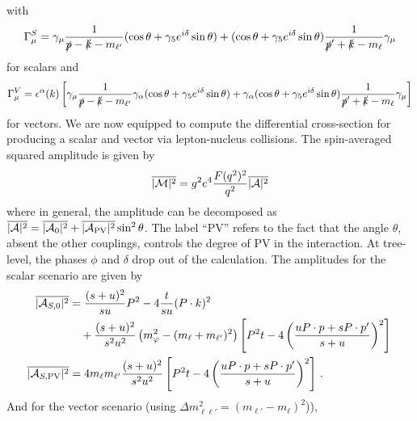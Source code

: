 with 
\begin{equation}
    \Gamma_\mu^S =  \gamma_\mu \frac{1}{\slashed{p}-\slashed{k}-m_{\ell'}}(\cos{\theta}+\gamma_5 e^{i\delta}\sin{\theta})+(\cos{\theta}+\gamma_5 e^{i\delta}\sin{\theta})\frac{1}{\slashed{p}'+\slashed{k}-m_\ell}\gamma_\mu \label{eq:scalar_vertex}
\end{equation}
for scalars and
\begin{equation}
    \Gamma_\mu^V =  \epsilon^\alpha(k)\left[\gamma_\mu \frac{1}{\slashed{p}-\slashed{k}-m_{\ell'}}\gamma_\alpha(\cos{\theta}+\gamma_5 e^{i\delta}\sin{\theta})+\gamma_\alpha(\cos{\theta}+\gamma_5 e^{i\delta}\sin{\theta})\frac{1}{\slashed{p}'+\slashed{k}-m_\ell}\gamma_\mu\right]\label{eq:vector_vertex}
\end{equation}
for vectors.
We are now equipped to compute the differential cross-section for producing a scalar and vector via lepton-nucleus collisions. The spin-averaged squared amplitude is given by
\begin{equation}
    \overline{|{\cal M}|^2} = g^2 e^4 \frac{F(q^2)^2}{q^2}\overline{|{\cal A}|^2}
\end{equation}
where in general, the amplitude can be decomposed as $\overline{|{\cal A}|^2} = \overline{|{\cal A}_0|^2} + \overline{|{\cal A}_{\rm PV}|^2}\sin^2{\theta}$. The label ``PV'' refers to the fact that the angle $\theta$, absent the other couplings, controls the degree of PV in the interaction. At tree-level, the phases $\phi$ and $\delta$ drop out of the calculation. The amplitudes for the scalar scenario are given by
\begin{align}
    \overline{|{\cal A}_{S,0}|^2} &=  \frac{(s+u)^2}{su}P^2 - 4\frac{t}{su}(P\cdot k)^2\nonumber \\
    &\ \ \ + \frac{(s+u)^2}{s^2u^2}\left(m_\varphi^2 - (m_{\ell} + m_{\ell'})^2\right)\left[P^2t - 4\left(\frac{uP\cdot p + sP\cdot p'}{s+u}\right)^2\right]\,\nonumber\\
    \overline{|{\cal A}_{S,{\rm PV}}|^2} &= 4m_{\ell}m_{\ell'}\frac{(s+u)^2}{s^2u^2}\left[P^2t - 4\left(\frac{uP\cdot p + sP\cdot p'}{s+u}\right)^2\right]\,.\label{eq:scalar_amplitudes}
\end{align}
And for the vector scenario (using $\Delta m_{\ell\ell'}^2 = (m_{\ell'} - m_\ell)^2$)), 
